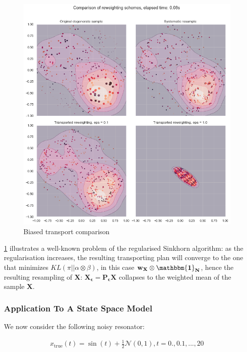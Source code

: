\documentclass[]{article}
\begin{document}
			\begin{figure}
				\centering
				\captionsetup{justification=centering}
				\includegraphics[width=\linewidth]{BiasedTransport}
				\caption{Biased transport comparison}
				\label{fig:BiasedTransport}
			\end{figure}	
		
			\cref{fig:BiasedTransport} illustrates a well-known problem of the regularised Sinkhorn algorithm: as the regularisation increases, the resulting transporting plan will converge to the one that minimizes $KL(\pi||\alpha\otimes\beta)$, in this case $\mathbf{w_X} \otimes \mathbf{\mathbbm{1}_N}$, hence the resulting resampling of $\mathbf{X}$: $\mathbf{X_\epsilon} = \mathbf{P_\epsilon} \mathbf{X}$ collapses to the weighted mean of the sample $\mathbf{X}$.
			
		\subsubsection{Application To A State Space Model}
			We now consider the following noisy resonator:
			
			\begin{align}
				x_\text{true}(t) = \sin(t) + \frac 1 2 \mathcal{N}(0, 1), t = 0., 0.1, ..., 20
			\end{align}
			
\end{document}
